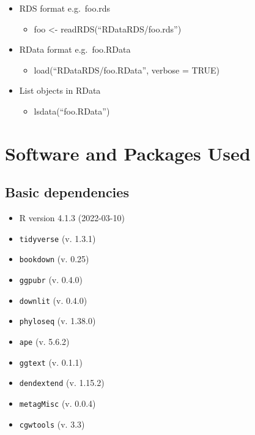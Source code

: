 \documentclass[
  12pt,
  openany]{book}
\providecommand{\tightlist}{%
  \setlength{\itemsep}{0pt}\setlength{\parskip}{0pt}}
\begin{document}
\begin{tmbarrowF}
\begin{itemize}
\tightlist
\item
  RDS format e.g.~foo.rds

  \begin{itemize}
  \tightlist
  \item
    foo \textless- readRDS(``RDataRDS/foo.rds'')
  \end{itemize}
\item
  RData format e.g.~foo.RData

  \begin{itemize}
  \tightlist
  \item
    load(``RDataRDS/foo.RData'', verbose = TRUE)
  \end{itemize}
\item
  List objects in RData

  \begin{itemize}
  \tightlist
  \item
    lsdata(``foo.RData'')
  \end{itemize}
\end{itemize}
\end{tmbarrowF}

\hypertarget{software-and-packages-used}{%
\chapter{Software and Packages Used}\label{software-and-packages-used}}

\hypertarget{basic-dependencies}{%
\section{Basic dependencies}\label{basic-dependencies}}

\begin{itemize}
\tightlist
\item
  R version 4.1.3 (2022-03-10)
\item
  \texttt{tidyverse} (v. 1.3.1)
\item
  \texttt{bookdown} (v. 0.25)
\item
  \texttt{ggpubr} (v. 0.4.0)
\item
  \texttt{downlit} (v. 0.4.0)
\item
  \texttt{phyloseq} (v. 1.38.0)
\item
  \texttt{ape} (v. 5.6.2)
\item
  \texttt{ggtext} (v. 0.1.1)
\item
  \texttt{dendextend} (v. 1.15.2)
\item
  \texttt{metagMisc} (v. 0.0.4)
\item
  \texttt{cgwtools} (v. 3.3)
\end{itemize}
\end{document}

